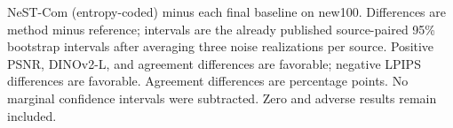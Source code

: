 NeST-Com (entropy-coded) minus each final baseline on new100. Differences are method minus reference; intervals are the already published source-paired 95\% bootstrap intervals after averaging three noise realizations per source. Positive PSNR, DINOv2-L, and agreement differences are favorable; negative LPIPS differences are favorable. Agreement differences are percentage points. No marginal confidence intervals were subtracted. Zero and adverse results remain included.
